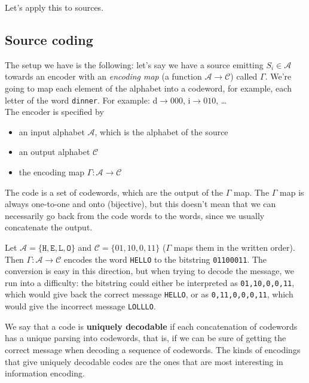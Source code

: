 \documentclass{report}
\begin{document}
\noindent Let's apply this to sources.

\subsection{Source coding}
The setup we have is the following: let's say we have a source emitting $S_i \in \mathcal A$ towards an encoder with an \emph{encoding map} (a function $\mathcal A \to \mathcal C$) called $\Gamma$. We're going to map each element of the alphabet into a codeword, for example, each letter of the word \texttt{dinner}. For example: d$\to 000$, i$\to 010$, \dots \\
The encoder is specified by
\begin{itemize}
	\item an input alphabet $\mathcal A$, which is the alphabet of the source
	\item an output alphabet $\mathcal C$
	\item the encoding map $\Gamma : \mathcal A \to \mathcal C$
\end{itemize}
The code is a set of codewords, which are the output of the $\Gamma$ map. The $\Gamma$ map is always one-to-one and onto (bijective), but this doesn't mean that we can necessarily go back from the code words to the words, since we usually concatenate the output.

\begin{exmp}
 Let $\mathcal A = \{\texttt H, \texttt E, \texttt L, \texttt O\}$ and $\mathcal C = \{01, 10, 0, 11\}$ ($\Gamma$ maps them in the written order). Then $\Gamma : \mathcal A \to \mathcal C$ encodes the word \texttt{HELLO} to the bitstring \texttt{01100011}. The conversion is easy in this direction, but when trying to decode the message, we run into a difficulty: the bitstring could either be interpreted as \texttt{01,10,0,0,11}, which would give back the correct message \texttt{HELLO}, or as \texttt{0,11,0,0,0,11}, which would give the incorrect message \texttt{LOLLLO}.
\end{exmp}

\begin{defn}
	We say that a code is \textbf{uniquely decodable} if each concatenation of codewords has a unique parsing into codewords, that is, if we can be sure of getting the correct message when decoding a sequence of codewords. The kinds of encodings that give uniquely decodable codes are the ones that are most interesting in information encoding. 
\end{defn}
\end{document}
